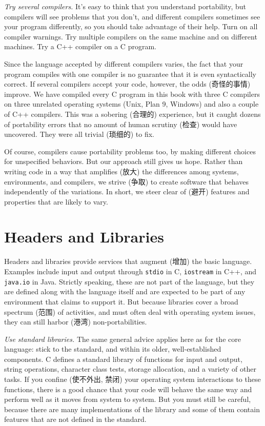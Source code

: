 \emph{Try several compilers.} It's easy to think that you understand
portability, but compilers will see problems that you don't, and different
compilers sometimes see your program differently, so you should take
advantage of their help. Turn on all compiler warnings. Try multiple
compilers on the same machine and on different machines.  Try a C++
compiler on a C program.

Since the language accepted by different compilers varies, the fact that
your program compiles with one compiler is no guarantee that it is even
syntactically correct.  If several compilers accept your code, however, the
odds (奇怪的事情) improve. We have compiled every C program in this book
with three C compilers on three unrelated operating systems (Unix, Plan 9,
Windows) and also a couple of C++ compilers. This was a sobering (合理的)
experience, but it caught dozens of portability errors that no amount of
human scrutiny (检查) would have uncovered. They were all trivial (琐细的)
to fix.

Of course, compilers cause portability problems too, by making different
choices for unspecified behaviors. But our approach still gives us hope.
Rather than writing code in a way that amplifies (放大) the differences
among systems, environments, and compilers, we strive (争取) to create
software that behaves independently of the variations. In short, we steer
clear of (避开) features and properties that are likely to vary.

\section{Headers and Libraries}
\label{sec:header_library}

Headers and libraries provide services that augment (增加) the basic
language.  Examples include input and output through \verb'stdio' in C,
\verb'iostream' in C++, and \verb'java.io' in Java.  Strictly speaking,
these are not part of the language, but they are defined along with the
language itself and are expected to be part of any environment that claims
to support it. But because libraries cover a broad spectrum (范围) of
activities, and must often deal with operating system issues, they can
still harbor (港湾) non-portabilities.

\emph{Use standard libraries.} The same general advice applies here as for
the core language: stick to the standard, and within its older,
well-established components. C defines a standard library of functions for
input and output, string operations, character class tests, storage
allocation, and a variety of other tasks. If you confine (使不外出, 禁闭)
your
operating system interactions to these functions, there is a good chance
that your code will behave the same way and perform well as it moves from
system to system. But you must still be careful, because there are many
implementations of the library and some of them contain features that are
not defined in the standard.

